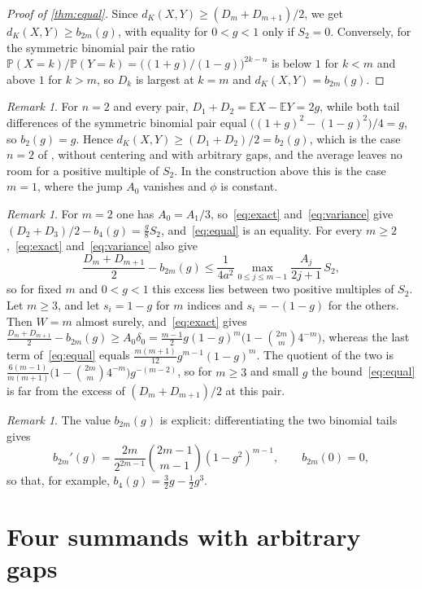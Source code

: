 \documentclass[11pt,a4paper]{article}
\numberwithin{equation}{section}
\theoremstyle{remark}
\newtheorem{remark}[theorem]{Remark}
\newcommand{\Pp}{\mathbb P}
\newcommand{\E}{\mathbb E}
\begin{document}
\begin{proof}[Proof of \cref{thm:equal}]
Since $d_K(X,Y)\ge(D_m+D_{m+1})/2$, we get $d_K(X,Y)\ge b_{2m}(g)$, with equality for $0<g<1$ only if $S_2=0$. Conversely, for the symmetric binomial pair the ratio $\Pp(X=k)/\Pp(Y=k)=\bigl((1+g)/(1-g)\bigr)^{2k-n}$ is below $1$ for $k<m$ and above $1$ for $k>m$, so $D_k$ is largest at $k=m$ and $d_K(X,Y)=b_{2m}(g)$.
\end{proof}

\begin{remark}\label{rem:n2}
For $n=2$ and every pair, $D_1+D_2=\E X-\E Y=2g$, while both tail differences of the symmetric binomial pair equal $\bigl((1+g)^2-(1-g)^2\bigr)/4=g$, so $b_2(g)=g$. Hence $d_K(X,Y)\ge(D_1+D_2)/2=b_2(g)$, which is the case $n=2$ of \cite[Theorem~1.1]{Long}, without centering and with arbitrary gaps, and the average leaves no room for a positive multiple of $S_2$. In the construction above this is the case $m=1$, where the jump $A_0$ vanishes and $\phi$ is constant.
\end{remark}

\begin{remark}\label{rem:size}
For $m=2$ one has $A_0=A_1/3$, so~\eqref{eq:exact} and~\eqref{eq:variance} give $(D_2+D_3)/2-b_4(g)=\frac g8S_2$, and~\eqref{eq:equal} is an equality. For every $m\ge2$,~\eqref{eq:exact} and~\eqref{eq:variance} also give
\[
\frac{D_m+D_{m+1}}2-b_{2m}(g)\le\frac1{4a^2}\max_{0\le j\le m-1}\frac{A_j}{2j+1}\,S_2 ,
\]
so for fixed $m$ and $0<g<1$ this excess lies between two positive multiples of $S_2$.
Let $m\ge3$, and let $s_i=1-g$ for $m$ indices and $s_i=-(1-g)$ for the others. Then $W=m$ almost surely, and~\eqref{eq:exact} gives $\frac{D_m+D_{m+1}}2-b_{2m}(g)\ge A_0\delta_0=\frac{m-1}2g(1-g)^m\bigl(1-\binom{2m}m4^{-m}\bigr)$, whereas the last term of~\eqref{eq:equal} equals $\frac{m(m+1)}{12}g^{m-1}(1-g)^m$. The quotient of the two is $\frac{6(m-1)}{m(m+1)}\bigl(1-\binom{2m}m4^{-m}\bigr)g^{-(m-2)}$, so for $m\ge3$ and small $g$ the bound~\eqref{eq:equal} is far from the excess of $(D_m+D_{m+1})/2$ at this pair.
\end{remark}

\begin{remark}\label{rem:b2m}
The value $b_{2m}(g)$ is explicit: differentiating the two binomial tails gives
\[
b_{2m}'(g)=\frac{2m}{2^{2m-1}}\binom{2m-1}{m-1}(1-g^2)^{m-1},\qquad b_{2m}(0)=0,
\]
so that, for example, $b_4(g)=\frac32g-\frac12g^3$.
\end{remark}

\section{Four summands with arbitrary gaps}\label{sec:four}
\end{document}
